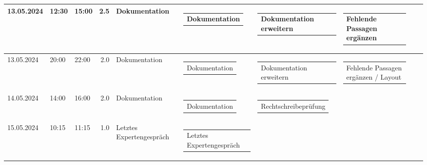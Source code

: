 {\begin{longtable}[H]{lllrllllll}
13.05.2024 & 12:30 & 15:00 & 2.5 & Dokumentation & \begin{tabular}[c]{@{}l@{}}Dokumentation\end{tabular} & \begin{tabular}[c]{@{}l@{}}Dokumentation erweitern\end{tabular} & \begin{tabular}[c]{@{}l@{}}Fehlende Passagen ergänzen\end{tabular} & \begin{tabular}[c]{@{}l@{}}\end{tabular} & \begin{tabular}[c]{@{}l@{}}\end{tabular} \\ \midrule
13.05.2024 & 20:00 & 22:00 & 2.0 & Dokumentation & \begin{tabular}[c]{@{}l@{}}Dokumentation\end{tabular} & \begin{tabular}[c]{@{}l@{}}Dokumentation erweitern\end{tabular} & \begin{tabular}[c]{@{}l@{}}Fehlende Passagen ergänzen / Layout\end{tabular} & \begin{tabular}[c]{@{}l@{}}\end{tabular} & \begin{tabular}[c]{@{}l@{}}\end{tabular} \\ \midrule
14.05.2024 & 14:00 & 16:00 & 2.0 & Dokumentation & \begin{tabular}[c]{@{}l@{}}Dokumentation\end{tabular} & \begin{tabular}[c]{@{}l@{}}Rechtschreibeprüfung\end{tabular} & \begin{tabular}[c]{@{}l@{}}\end{tabular} & \begin{tabular}[c]{@{}l@{}}\end{tabular} & \begin{tabular}[c]{@{}l@{}}\end{tabular} \\ \midrule
15.05.2024 & 10:15 & 11:15 & 1.0 & Letztes Expertengespräch & \begin{tabular}[c]{@{}l@{}}Letztes Expertengespräch\end{tabular} & \begin{tabular}[c]{@{}l@{}}\end{tabular} & \begin{tabular}[c]{@{}l@{}}\end{tabular} & \begin{tabular}[c]{@{}l@{}}\end{tabular} & \begin{tabular}[c]{@{}l@{}}\end{tabular} \\ \midrule

\end{longtable}}
